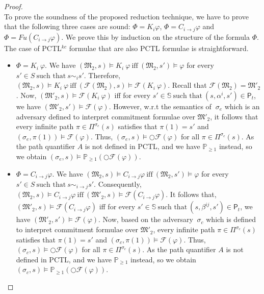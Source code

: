 \begin{proof} \hspace{0.5cm} \\
To prove the soundness of the proposed reduction technique, we have to prove that the following three cases are sound: $\Phi =
K_i\varphi$, $\Phi = C_{i \rightarrow j} \varphi$ and $\Phi = Fu(C_{i \rightarrow j} \varphi)$. We prove this by induction on the structure of the formula
$\Phi$. The case of PCTL$^{kc}$ formulae that are also PCTL formulae is straightforward.

\begin{itemize}
\item $\Phi = K_i ~\varphi$. We have $(\mathfrak{M_2},s)\models K_i ~\varphi ~\text{iff}~ (\mathfrak{M_2},s') \models \varphi$ for every $s' \in S ~\textrm{such that}~ s\sim_i s'$. Therefore, $(\mathfrak{M_2},s)\models K_i ~\varphi ~\text{iff}~ (\mathscr{F}(\mathfrak{M_2}),s) \models \mathscr{F}(K_i~\varphi)$. Recall that $\mathscr{F}(\mathfrak{M_2})= \mathfrak{M'_2}$. Now, $(\mathfrak{M'_2},s) \models \mathscr{F}(K_i~\varphi)$ iff for every $s' \in \mathbb{S} ~\textrm{such that}~ (s,\alpha^i,s') \in \textsf{P}_t$, we have $(\mathfrak{M'_2},s') \models \mathscr{F}(\varphi)$. However, w.r.t the semantics of $~\sigma_e$ which is an adversary defined to interpret commitment formulae over $\mathfrak{M'_2}$, it follows that every infinite path $\pi \in \Pi^{\sigma_e}(s)$ satisfies that $\pi(1)=s'$ and $(\sigma_e,\pi(1))\models \mathscr{F}(\varphi)$. Thus, $(\sigma_e,s)\models \bigcirc\mathscr{F}(\varphi)$ for all $\pi \in \Pi^{\sigma_e}(s)$. As the path quantifier $A$ is not defined in PCTL, and we have $\mathbb{P}_{\geq1}$ instead, so we obtain $(\sigma_e,s)\models \mathbb{P}_{\geq1}(\bigcirc\mathscr{F}(\varphi))$.

\item $\Phi = C_{i \rightarrow j} \varphi$. We have $(\mathfrak{M_2},s)\models C_{i\rightarrow j}\varphi ~\text{iff}~ (\mathfrak{M_2},s') \models \varphi$ for every $s' \in S ~\textrm{such that}~ s\sim_{i \rightarrow j}s'$. Consequently, $(\mathfrak{M_2},s) \models C_{i\rightarrow j} \varphi ~\text{iff}~ (\mathfrak{M'_2},s) \models \mathscr{F}(C_{i\rightarrow j} \varphi)$. It follows that, $(\mathfrak{M'_2},s) \models  \mathscr{F}(C_{i\rightarrow j}\varphi)$ iff for every $s' \in \mathbb{S} ~\textrm{such that}~ (s,\beta^{ij},s') \in \textsf{P}_t$, we have $(\mathfrak{M'_2},s') \models  \mathscr{F}(\varphi)$. Now, based on the adversary $~\sigma_c$ which is defined to interpret commitment formulae over $\mathfrak{M'_2}$, every infinite path $\pi \in \Pi^{\sigma_c}(s)$ satisfies that $\pi(1)=s'$ and $(\sigma_c,\pi(1))\models \mathscr{F}(\varphi)$. Thus, $(\sigma_c,s)\models \bigcirc\mathscr{F}(\varphi)$ for all $\pi \in \Pi^{\sigma_c}(s)$. As the path quantifier $A$ is not defined in PCTL, and we have $\mathbb{P}_{\geq1}$ instead, so we obtain $(\sigma_c,s)\models  \mathbb{P}_{\geq1}(\bigcirc\mathscr{F}(\varphi))$.


\end{itemize}
\end{proof}
